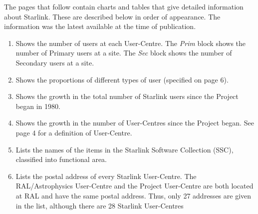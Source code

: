 \begin{latexonly}
\newpage


The pages that follow contain charts and tables that give detailed information
about Starlink.
These are described below in order of appearance.
The information was the latest available at the time of publication.

\begin{enumerate}

\item Shows the number of users at each User-Centre.
The {\em Prim}\/ block shows the number of Primary users at a site.
The {\em Sec}\/ block shows the number of Secondary users at a site.

\item Shows the proportions of different types of user (specified on page 6).

\item Shows the growth in the total number of Starlink users since the Project
began in 1980.

\item Shows the growth in the number of User-Centres since the Project began.
See page 4 for a definition of User-Centre.

\item Lists the names of the items in the Starlink Software Collection
(SSC), classified into functional area.

\item Lists the postal address of every Starlink User-Centre.
The RAL/Astrophysics User-Centre and the Project User-Centre are both located
at RAL and have the same postal address.
Thus, only 27 addresses are given in the list, although there are 28 Starlink
User-Centres

\end{enumerate}
\end{latexonly}



